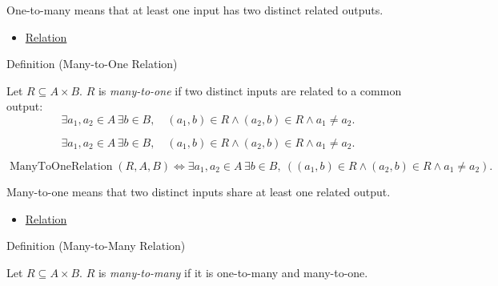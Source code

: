 \begin{remark*}[Interpretation]
One-to-many means that at least one input has two distinct related outputs.
\end{remark*}

\begin{dependencies}
\begin{itemize}
  \item \hyperref[def:relation]{Relation}
\end{itemize}
\end{dependencies}

\begin{definitionbox}{Definition (Many-to-One Relation)}
\begin{definition}\label{def:many-to-one-relation}
Let $R\subseteq A\times B$.
$R$ is \emph{many-to-one} if two distinct inputs are related to a common output:
\[
\exists a_1,a_2\in A\,\exists b\in B,\quad
(a_1,b)\in R\land (a_2,b)\in R\land a_1\neq a_2.
\]
\end{definition}
\end{definitionbox}

\begin{remark*}
\[
  \exists a_1,a_2\in A\,\exists b\in B,\quad
  (a_1,b)\in R\wedge(a_2,b)\in R\wedge a_1\neq a_2.
\]
\end{remark*}

\begin{remark*}
\[
  \operatorname{ManyToOneRelation}(R,A,B)
  \iff
  \exists a_1,a_2\in A\,\exists b\in B,\ ((a_1,b)\in R\wedge(a_2,b)\in R\wedge a_1\neq a_2).
\]
\end{remark*}

\begin{remark*}[Interpretation]
Many-to-one means that two distinct inputs share at least one related output.
\end{remark*}

\begin{dependencies}
\begin{itemize}
  \item \hyperref[def:relation]{Relation}
\end{itemize}
\end{dependencies}

\begin{definitionbox}{Definition (Many-to-Many Relation)}
\begin{definition}\label{def:many-to-many-relation}
Let $R\subseteq A\times B$.
$R$ is \emph{many-to-many} if it is one-to-many and many-to-one.
\end{definition}
\end{definitionbox}

